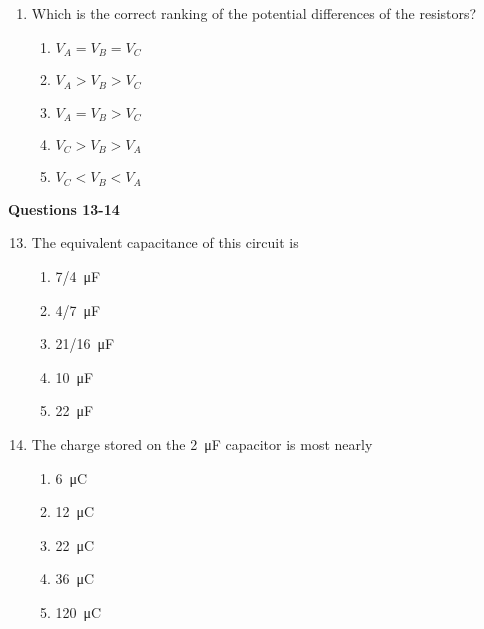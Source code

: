 \documentclass[11pt]{article}
\begin{document}
\begin{multicols}{2}
\begin{enumerate}[leftmargin=18pt]
  \item Which is the correct ranking of the potential differences of the
    resistors?
    \begin{enumerate}[noitemsep,topsep=0pt,leftmargin=18pt,label=(\Alph*)]
    \item $V_A = V_B = V_C$
    \item $V_A > V_B > V_C$
    \item $V_A = V_B > V_C$
    \item $V_C > V_B > V_A$
    \item $V_C < V_B < V_A$
    \end{enumerate}
  \end{enumerate}

  \columnbreak
  
  \textbf{Questions 13-14}

  \begin{center}
  \end{center}

  \begin{enumerate}[leftmargin=18pt]
    \setcounter{enumi}{12}
  \item The equivalent capacitance of this circuit is
    \begin{enumerate}[noitemsep,topsep=0pt,leftmargin=18pt,label=(\Alph*)]
    \item\SI{7/4}{\micro\farad}
    \item\SI{4/7}{\micro\farad}
    \item\SI{21/16}{\micro\farad}
    \item\SI{10}{\micro\farad}
    \item\SI{22}{\micro\farad}
    \end{enumerate}
    
  \item The charge stored on the \SI{2}{\micro\farad} capacitor is most nearly
    \begin{enumerate}[noitemsep,topsep=0pt,leftmargin=18pt,label=(\Alph*)]
    \item\SI{6}{\micro\coulomb}
    \item\SI{12}{\micro\coulomb}
    \item\SI{22}{\micro\coulomb}
    \item\SI{36}{\micro\coulomb}
    \item\SI{120}{\micro\coulomb}
    \end{enumerate}
    

\end{enumerate}
\end{multicols}
\end{document}
